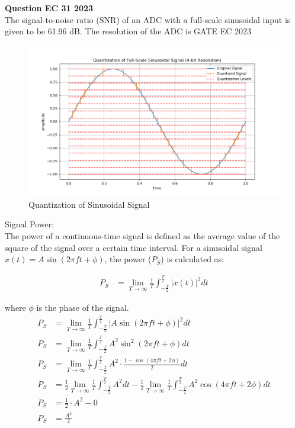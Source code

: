 \documentclass[journal,12pt,onecolumn]{IEEEtran}
\begin{document}
\vspace{3cm}
\title{}
\author{EE22BTECH11049 - Shivansh Kirar}
\maketitle
\textbf{Question EC 31 2023}\\
The signal-to-noise ratio (SNR) of an ADC with a full-scale sinusoidal input is given to be 61.96 dB. The resolution of the ADC is \hfill{GATE EC 2023}
\fi
\Solution
\begin{table}[H]

\label{table:Gate.31.2023.0}
\end{table}
\begin{figure}[H]
  \centering
  \includegraphics[width=1\textwidth]{2023/EC/31/Graph/a.png}
  \caption{Quantization of Sinusoidal Signal}
  \label{fig:Gate.31.2023.1}
\end{figure}
\enumerate
\item Signal Power: \\
The power of a continuous-time signal is defined as the average value of the square of the signal over a certain time interval. For a sinusoidal signal \(x(t) = A \sin(2\pi f t + \phi)\), the power (\(P_S\)) is calculated as:

\begin{align}
P_S &= \lim_{{T \to \infty}} \frac{1}{T} \int_{{-\frac{T}{2}}}^{{\frac{T}{2}}} |x(t)|^2 dt
\end{align}

where \(\phi\) is the phase of the signal.
\begin{align}
P_S &= \lim_{{T \to \infty}} \frac{1}{T} \int_{{-\frac{T}{2}}}^{{\frac{T}{2}}} |A \sin(2\pi f t + \phi)|^2 dt\\
P_S &= \lim_{{T \to \infty}} \frac{1}{T} \int_{{-\frac{T}{2}}}^{{\frac{T}{2}}} A^2 \sin^2(2\pi f t + \phi) dt\\
P_S &= \lim_{{T \to \infty}} \frac{1}{T} \int_{{-\frac{T}{2}}}^{{\frac{T}{2}}} A^2 \cdot \frac{1 - \cos(4\pi f t + 2\phi)}{2} dt\\
P_S &= \frac{1}{2} \lim_{{T \to \infty}} \frac{1}{T} \int_{{-\frac{T}{2}}}^{{\frac{T}{2}}} A^2 dt - \frac{1}{2} \lim_{{T \to \infty}} \frac{1}{T} \int_{{-\frac{T}{2}}}^{{\frac{T}{2}}} A^2 \cos(4\pi f t + 2\phi) dt\\
P_S &= \frac{1}{2} \cdot A^2 - 0\\
P_S &= \frac{A^2}{2}\\
\end{align}
\end{document}
